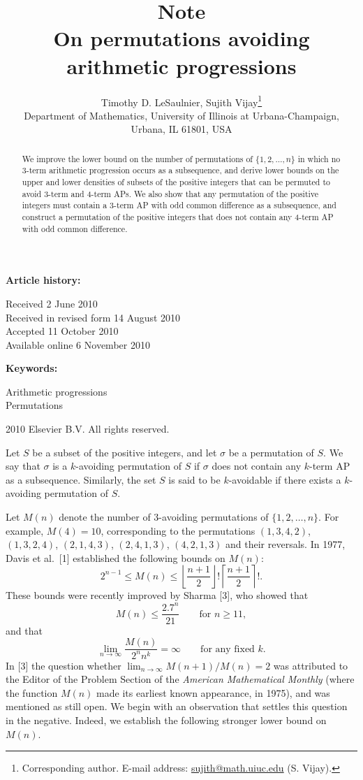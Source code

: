 \documentclass[10pt]{article}
\title{\normalsize Note\\[1ex]
  \LARGE On permutations avoiding arithmetic progressions}
\author{Timothy D. LeSaulnier, Sujith Vijay\thanks{Corresponding author. E-mail address: \href{mailto:sujith@math.uiuc.edu}{sujith@math.uiuc.edu} (S. Vijay).}\\
  \small Department of Mathematics, University of Illinois at Urbana-Champaign,\\
  \small Urbana, IL 61801, USA}
\date{}
\begin{document}
\maketitle

\noindent
\textbf{Article history:}\par
\noindent
Received 2 June 2010\\
Received in revised form 14 August 2010\\
Accepted 11 October 2010\\
Available online 6 November 2010

\medskip
\noindent
\textbf{Keywords:}\par
\noindent
Arithmetic progressions\\
Permutations

\begin{abstract}
We improve the lower bound on the number of permutations of
$\{1,2,\ldots,n\}$ in which no 3-term arithmetic progression occurs as a
subsequence, and derive lower bounds on the upper and lower densities of
subsets of the positive integers that can be permuted to avoid 3-term and
4-term APs. We also show that any permutation of the positive integers must
contain a 3-term AP with odd common difference as a subsequence, and construct
a permutation of the positive integers that does not contain any 4-term AP
with odd common difference.
\end{abstract}

\begin{flushright}
\textcopyright{} 2010 Elsevier B.V. All rights reserved.
\end{flushright}

Let $S$ be a subset of the positive integers, and let $\sigma$ be a permutation
of $S$. We say that $\sigma$ is a $k$-avoiding permutation of $S$ if $\sigma$
does not contain any $k$-term AP as a subsequence. Similarly, the set $S$ is
said to be $k$-avoidable if there exists a $k$-avoiding permutation of $S$.

Let $M(n)$ denote the number of 3-avoiding permutations of
$\{1,2,\ldots,n\}$. For example, $M(4)=10$, corresponding to the permutations
$(1,3,4,2)$, $(1,3,2,4)$, $(2,1,4,3)$, $(2,4,1,3)$, $(4,2,1,3)$ and their
reversals. In 1977, Davis et al.\ [1] established the following bounds on
$M(n)$:
\[
  2^{n-1}
  \leq M(n)
  \leq \left\lfloor\frac{n+1}{2}\right\rfloor!
         \left\lceil\frac{n+1}{2}\right\rceil!.
\]
These bounds were recently improved by Sharma [3], who showed that
\[
  M(n) \leq \frac{2.7^n}{21}
  \qquad\text{for } n\geq 11,
\]
and that
\[
  \lim_{n\to\infty}\frac{M(n)}{2^n n^k}=\infty
  \qquad\text{for any fixed } k.
\]
In [3] the question whether
$\lim_{n\to\infty} M(n+1)/M(n)=2$ was attributed to the Editor of the Problem
Section of the \emph{American Mathematical Monthly} (where the function
$M(n)$ made its earliest known appearance, in 1975), and was mentioned as
still open. We begin with an observation that settles this question in the
negative. Indeed, we establish the following stronger lower bound on $M(n)$.
\end{document}
